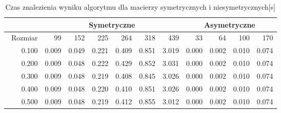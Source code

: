 \begin{table}
\centering
\begin{tabular}{|r|r|r|r|r|r|r|r|r|r|r|}
\hline
 & \multicolumn{6}{|c|}{Symetryczne} & \multicolumn{4}{|c|}{Asymetryczne} \\ \hline\
Rozmiar & 99 & 152 & 225 & 264 & 318 & 439 & 33 & 64 & 100 & 170 \\ \hline
0.100 & 0.009 & 0.049 & 0.221 & 0.409 & 0.851 & 3.019 & 0.000 & 0.002 & 0.010 & 0.074 \\
0.200 & 0.009 & 0.048 & 0.222 & 0.429 & 0.852 & 3.031 & 0.000 & 0.002 & 0.010 & 0.074 \\
0.300 & 0.009 & 0.048 & 0.219 & 0.408 & 0.845 & 3.026 & 0.000 & 0.002 & 0.010 & 0.074 \\
0.400 & 0.009 & 0.048 & 0.220 & 0.410 & 0.851 & 3.026 & 0.000 & 0.002 & 0.010 & 0.074 \\
0.500 & 0.009 & 0.048 & 0.219 & 0.412 & 0.855 & 3.012 & 0.000 & 0.002 & 0.010 & 0.074 \\ \hline
\end{tabular}
\caption{Czas znalezienia wyniku algorytmu dla macierzy symetrycznych i niesymetrycznych[s]}
\label{tab:time_AoRho}
\end{table}
